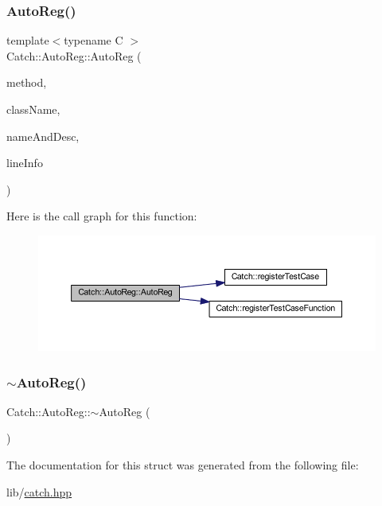 \hypertarget{struct_catch_1_1_auto_reg_a1bf9207fe0a02b46dc0ab1cc03cbe738}{}\label{struct_catch_1_1_auto_reg_a1bf9207fe0a02b46dc0ab1cc03cbe738} 
\subsubsection{\texorpdfstring{Auto\+Reg()}{AutoReg()}\hspace{0.1cm}{\footnotesize\ttfamily [2/2]}}
{\footnotesize\ttfamily template$<$typename C $>$ \\
Catch\+::\+Auto\+Reg\+::\+Auto\+Reg (\begin{DoxyParamCaption}\item[{void(C\+::$\ast$)()}]{method,  }\item[{char const $\ast$}]{class\+Name,  }\item[{\hyperlink{struct_catch_1_1_name_and_desc}{Name\+And\+Desc} const \&}]{name\+And\+Desc,  }\item[{\hyperlink{struct_catch_1_1_source_line_info}{Source\+Line\+Info} const \&}]{line\+Info }\end{DoxyParamCaption})\hspace{0.3cm}{\ttfamily [inline]}}

Here is the call graph for this function\+:\nopagebreak
\begin{figure}[H]
\begin{center}
\leavevmode
\includegraphics[width=350pt]{struct_catch_1_1_auto_reg_a1bf9207fe0a02b46dc0ab1cc03cbe738_cgraph}
\end{center}
\end{figure}
\hypertarget{struct_catch_1_1_auto_reg_a3cdb53f1e5ff115310f3372bebe198f1}{}\label{struct_catch_1_1_auto_reg_a3cdb53f1e5ff115310f3372bebe198f1} 
\subsubsection{\texorpdfstring{$\sim$\+Auto\+Reg()}{~AutoReg()}}
{\footnotesize\ttfamily Catch\+::\+Auto\+Reg\+::$\sim$\+Auto\+Reg (\begin{DoxyParamCaption}{ }\end{DoxyParamCaption})}



The documentation for this struct was generated from the following file\+:\begin{DoxyCompactItemize}
\item 
lib/\hyperlink{catch_8hpp}{catch.\+hpp}\end{DoxyCompactItemize}
